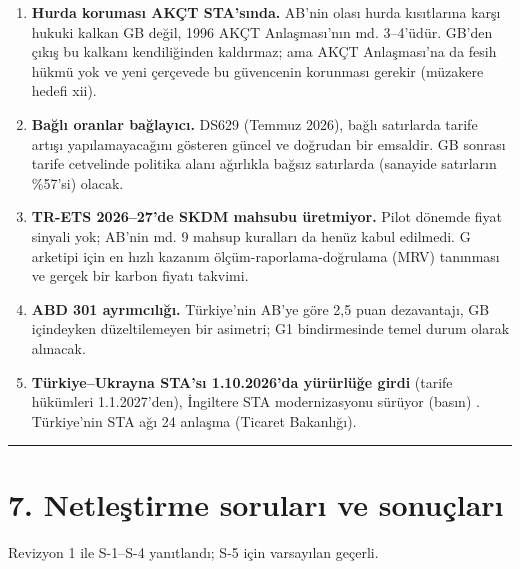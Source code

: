 \begin{enumerate}
\def\labelenumi{\arabic{enumi}.}
\tightlist
\item
  \textbf{Hurda koruması AKÇT STA'sında.} AB'nin olası hurda kısıtlarına karşı hukuki kalkan GB değil, 1996 AKÇT Anlaşması'nın md. 3--4'üdür. GB'den çıkış bu kalkanı kendiliğinden kaldırmaz; ama AKÇT Anlaşması'na da fesih hükmü yok ve yeni çerçevede bu güvencenin korunması gerekir (müzakere hedefi xii).
\item
  \textbf{Bağlı oranlar bağlayıcı.} DS629 (Temmuz 2026), bağlı satırlarda tarife artışı yapılamayacağını gösteren güncel ve doğrudan bir emsaldir. GB sonrası tarife cetvelinde politika alanı ağırlıkla bağsız satırlarda (sanayide satırların \%57'si) olacak.
\item
  \textbf{TR-ETS 2026--27'de SKDM mahsubu üretmiyor.} Pilot dönemde fiyat sinyali yok; AB'nin md. 9 mahsup kuralları da henüz kabul edilmedi. G arketipi için en hızlı kazanım ölçüm-raporlama-doğrulama (MRV) tanınması ve gerçek bir karbon fiyatı takvimi.
\item
  \textbf{ABD 301 ayrımcılığı.} Türkiye'nin AB'ye göre 2,5 puan dezavantajı, GB içindeyken düzeltilemeyen bir asimetri; G1 bindirmesinde temel durum olarak alınacak.
\item
  \textbf{Türkiye--Ukrayna STA'sı 1.10.2026'da yürürlüğe girdi} (tarife hükümleri 1.1.2027'den), İngiltere STA modernizasyonu sürüyor (basın) \etiketD{}. Türkiye'nin STA ağı 24 anlaşma \etiketV{} (Ticaret Bakanlığı).
\end{enumerate}

\begin{center}\rule{0.5\linewidth}{0.5pt}\end{center}

\hypertarget{00_plan-7-netleux15ftirme-sorularux131-ve-sonuuxe7larux131}{%
\section{7. Netleştirme soruları ve sonuçları}\label{00_plan-7-netleux15ftirme-sorularux131-ve-sonuuxe7larux131}}

Revizyon 1 ile S-1--S-4 yanıtlandı; S-5 için varsayılan geçerli.

\begingroup\gbtablo\small

